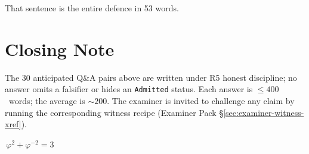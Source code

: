 That sentence is the entire defence in 53 words.

\section*{Closing Note}

\noindent
The 30 anticipated Q\&A pairs above are written under R5 honest
discipline; no answer omits a falsifier or hides an \texttt{Admitted}
status. Each answer is \(\le 400\)~words; the average is \(\sim 200\). The
examiner is invited to challenge any claim by running the corresponding
witness recipe (Examiner Pack \S\ref{sec:examiner-witness-xref}).

\bigskip
\centerline{\(\boxed{\,\varphi^{2}+\varphi^{-2}=3\,}\)}
\bigskip


